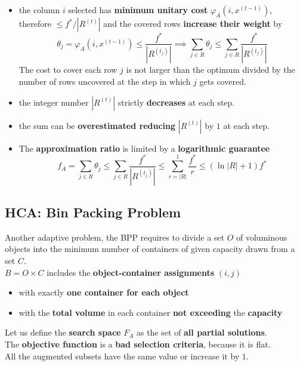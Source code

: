 \documentclass[11pt]{article}
\begin{document}
\begin{itemize}
		\item the column $i$ selected has \textbf{minimum unitary cost} $\varphi_A (i, x^{(t−1)})$, therefore $\leq f^\ast /|R^{(t)}|$ and the covered rows \textbf{increase their weight} by
		$$ \theta_j = \varphi_A (i, x^{(t-1)}) \leq \frac{f^\ast}{|R^{(t_j)}|} \implies \sum_{j \in R} \theta_j \leq \sum_{j \in R} \frac{f^\ast}{|R^{(t_j)}|} $$
		The cost to cover each row $j$ is not larger than the optimum divided by the number of rows uncovered at the step in which $j$ gets covered.\\
		
		\item the integer number $|R^{(t)}|$ strictly \textbf{decreases} at each step.\\
		
		\item the sum can be \textbf{overestimated reducing} $|R^{(t)}|$ by $1$ at each step.\\
		
		\item The \textbf{approximation ratio} is limited by a \textbf{logarithmic guarantee}
		$$ f_A = \sum_{j \in R} \theta_j \leq \sum_{j \in R} \frac{f^\ast}{|R^{(t_j)}|} \leq \sum_{r=|R|}^1 \frac{f^\ast}{r} \leq \left(\ln |R| + 1\right) f^\ast $$
	\end{itemize}
	
	\newpage
	
	\subsection{HCA: Bin Packing Problem}
	Another adaptive problem, the BPP requires to divide a set $O$ of voluminous objects into the minimum number of containers of given capacity drawn from a set $C$.\\
	
	$B = O \times C$ includes the \textbf{object-container assignments} $(i, j)$
	\begin{itemize}
		\item with exactly \textbf{one container for each object}
		\item with the \textbf{total volume} in each container \textbf{not exceeding} the \textbf{capacity}
	\end{itemize}
	
	Let us define the \textbf{search space} $F_A$ as the set of \textbf{all partial solutions}.\\
	
	The \textbf{objective function} is a \textbf{bad selection criteria}, because it is flat.\\
	All the augmented subsets have the same value or increase it by $1$.\\
	
\end{document}
